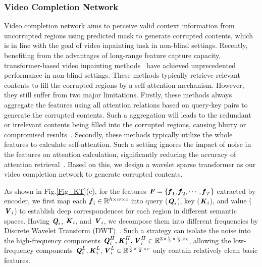 \subsubsection{Video Completion Network}
\label{Video Completion Network}
Video completion network aims to perceive valid context information from uncorrupted regions using predicted mask to generate corrupted contents, which is in line with the goal of video inpainting task in non-blind settings. 
Recently, benefiting from the advantages of long-range feature capture capacity, 
transformer-based video inpainting methods~\cite{cai2022devit,liu2021fuseformer,Ren_2022_CVPR,yan2020sttn,zhang2022flow}
have achieved unprecedented performance in non-blind settings.
These methods typically retrieve relevant contents to fill the corrupted regions by a self-attention mechanism.
However, they still suffer from two major limitations. 
Firstly, these methods always aggregate the features using all attention relations based on query-key pairs to generate the corrupted contents. 
Such a aggregation will leads to the redundant or irrelevant contents being filled into the corrupted regions, causing blurry or compromised results~\cite{chen2023learning,zhou2024adapt}. 
Secondly, these methods typically utilize the whole features to calculate self-attention.
Such a setting ignores the impact of noise in the features on attention calculation, significantly reducing the accuracy of attention retrieval~\cite{wu2024waveformer}.
Based on this, we design a wavelet sparse transformer as our video completion network to generate corrupted contents.

As shown in Fig.\ref{Fig_KT}(c), for the features $\textbf{\emph{F}}=\{\textbf{\emph{f}}_1, \textbf{\emph{f}}_2, \cdots,\textbf{\emph{f}}_T\}$ extracted by encoder, we first map each $\textbf{\emph{f}}_i\in\mathbb{R}^{{h}\times{{w}}\times{c}}$ into query ($\textbf{\emph{Q}}_i$), key ($\textbf{\emph{K}}_i$), and value ($\textbf{\emph{V}}_i$) to establish deep correspondences for each region in different semantic spaces. 
Having $\textbf{\emph{Q}}_i$, $\textbf{\emph{K}}_i$, and $\textbf{\emph{V}}_i$, we decompose them into different frequencies by Discrete Wavelet Transform (DWT)~\cite{1989A}.
Such a strategy can isolate the noise into the high-frequency components $\textbf{\emph{Q}}_i^H, \textbf{\emph{K}}_i^H, \textbf{\emph{V}}_i^H \in \mathbb{R}^{3\times{\frac{h}{2}}\times{{\frac{w}{2}}}\times{c}}$,  allowing the low-frequency components $\textbf{\emph{Q}}_i^L, \textbf{\emph{K}}_i^L, \textbf{\emph{V}}_i^L\in\mathbb{R}^{{\frac{h}{2}}\times{{\frac{w}{2}}}\times{c}}$ only contain relatively clean basic features.

